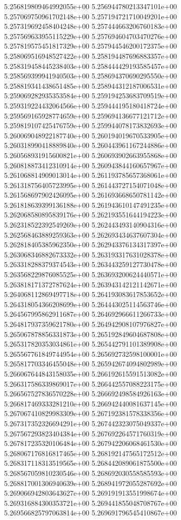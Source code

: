 5.256819809464992055e+00
5.256944780213347101e+00
5.257069750961702148e+00
5.257194721710049201e+00
5.257319692458404248e+00
5.257444663206760183e+00
5.257569633955115229e+00
5.257694604703470276e+00
5.257819575451817329e+00
5.257944546200172375e+00
5.258069516948527422e+00
5.258194487696883357e+00
5.258319458445238403e+00
5.258444429193585457e+00
5.258569399941940503e+00
5.258694370690295550e+00
5.258819341438651485e+00
5.258944312187006531e+00
5.259069282935353584e+00
5.259194253683709519e+00
5.259319224432064566e+00
5.259444195180418724e+00
5.259569165928774659e+00
5.259694136677121712e+00
5.259819107425476759e+00
5.259944078173832693e+00
5.260069048922187740e+00
5.260194019670533905e+00
5.260318990418889840e+00
5.260443961167244886e+00
5.260568931915600821e+00
5.260693902663955868e+00
5.260818873412310914e+00
5.260943844160657967e+00
5.261068814909013014e+00
5.261193785657368061e+00
5.261318756405723995e+00
5.261443727154071048e+00
5.261568697902426095e+00
5.261693668650781142e+00
5.261818639399136188e+00
5.261943610147491235e+00
5.262068580895839176e+00
5.262193551644194223e+00
5.262318522392549269e+00
5.262443493140904316e+00
5.262568463889259363e+00
5.262693434637607304e+00
5.262818405385962350e+00
5.262943376134317397e+00
5.263068346882673332e+00
5.263193317631028378e+00
5.263318288379374543e+00
5.263443259127730478e+00
5.263568229876085525e+00
5.263693200624440571e+00
5.263818171372787624e+00
5.263943142121142671e+00
5.264068112869497718e+00
5.264193083617853652e+00
5.264318054366208699e+00
5.264443025114563746e+00
5.264567995862911687e+00
5.264692966611266733e+00
5.264817937359621780e+00
5.264942908107976827e+00
5.265067878856331873e+00
5.265192849604687808e+00
5.265317820353034861e+00
5.265442791101389908e+00
5.265567761849744954e+00
5.265692732598100001e+00
5.265817703346455048e+00
5.265942674094802989e+00
5.266067644843158035e+00
5.266192615591513082e+00
5.266317586339869017e+00
5.266442557088223175e+00
5.266567527836570228e+00
5.266692498584926163e+00
5.266817469333281210e+00
5.266942440081637145e+00
5.267067410829983309e+00
5.267192381578338356e+00
5.267317352326694291e+00
5.267442323075049337e+00
5.267567293823404384e+00
5.267692264571760319e+00
5.267817235320106484e+00
5.267942206068461530e+00
5.268067176816817465e+00
5.268192147565172512e+00
5.268317118313519565e+00
5.268442089061875500e+00
5.268567059810230546e+00
5.268692030558585593e+00
5.268817001306940639e+00
5.268941972055287692e+00
5.269066942803643627e+00
5.269191913551998674e+00
5.269316884300353721e+00
5.269441855048708767e+00
5.269566825797063814e+00
5.269691796545410867e+00

